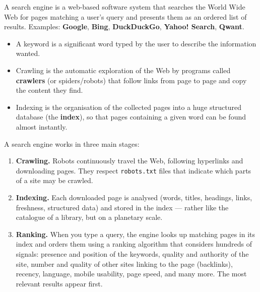 \documentclass[11pt]{article}
\newcommand{\cle}[1]{{\popxbold\color{popdark}#1}}
\begin{document}
\begin{definition}
A \cle{search engine} is a web-based software system that searches the World Wide Web for pages matching a user's query and presents them as an ordered list of results. Examples: \textbf{Google}, \textbf{Bing}, \textbf{DuckDuckGo}, \textbf{Yahoo! Search}, \textbf{Qwant}.
\begin{itemize}
\item A \cle{keyword} is a significant word typed by the user to describe the information wanted.
\item \cle{Crawling} is the automatic exploration of the Web by programs called \textbf{crawlers} (or spiders/robots) that follow links from page to page and copy the content they find.
\item \cle{Indexing} is the organisation of the collected pages into a huge structured database (the \textbf{index}), so that pages containing a given word can be found almost instantly.
\end{itemize}
\end{definition}

A search engine works in three main stages:

\begin{enumerate}
\item \textbf{Crawling.} Robots continuously travel the Web, following hyperlinks and downloading pages. They respect \texttt{robots.txt} files that indicate which parts of a site may be crawled.
\item \textbf{Indexing.} Each downloaded page is analysed (words, titles, headings, links, freshness, structured data) and stored in the index --- rather like the catalogue of a library, but on a planetary scale.
\item \textbf{Ranking.} When you type a query, the engine looks up matching pages in its index and orders them using a \cle{ranking algorithm} that considers hundreds of signals: presence and position of the keywords, quality and authority of the site, number and quality of other sites linking to the page (backlinks), recency, language, mobile usability, page speed, and many more. The most relevant results appear first.
\end{enumerate}
\end{document}
